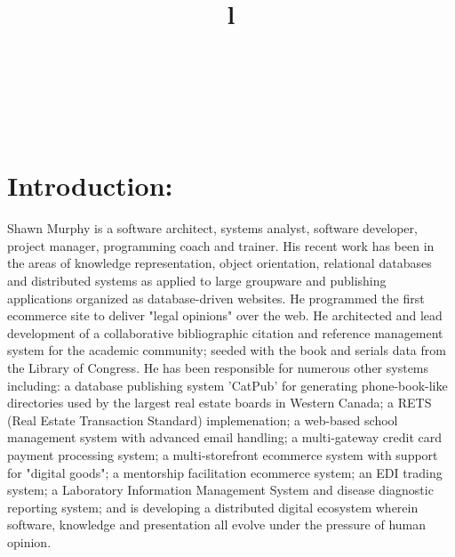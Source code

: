 \resumewidth=7in
\begin{resume}


\begin{format}
\title{l}\\
\\
\body\\
\end{format}


\section{Introduction:}
\begin{par}
Shawn Murphy is a software architect, systems analyst, 
software developer, project manager, programming coach and trainer.
His recent work has been in the areas of knowledge representation, 
object orientation, relational databases 
and distributed systems as applied to large groupware and
publishing applications organized as database-driven websites.  
He programmed the first ecommerce site to deliver 
"legal opinions" over the web.  
He architected and lead development of a collaborative 
bibliographic citation and
reference management system for the academic community; seeded with
the book and serials data from the Library of Congress.  
He has been responsible for numerous other systems including: 
a database publishing system 'CatPub' for generating phone-book-like directories used by the largest real estate boards in Western Canada;
a RETS (Real Estate Transaction Standard) implemenation;
a web-based school management system with advanced email handling; 
a multi-gateway credit card payment processing system; 
a multi-storefront ecommerce system with support for "digital goods"; 
a mentorship facilitation ecommerce system; 
an EDI trading system; 
a Laboratory Information Management System and disease diagnostic
reporting system; 
and is developing a distributed digital ecosystem wherein software, knowledge and 
presentation all evolve under the pressure of human opinion.
\end{par}



\end{resume}
